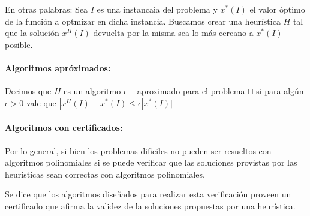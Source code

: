 En otras palabras: Sea \(I\) es una instancaia del problema y \(x^*(I)\) el valor óptimo de la función a optmizar en dicha instancia. Buscamos crear una heurística \(H\) tal que la solución \(x^H(I)\) devuelta por la misma sea lo más cercano a \(x^*(I)\) posible.

\paragraph{Algoritmos apróximados:} Decimos que \(H\) es un algoritmo \(\epsilon-\)aproximado para el problema \(\sqcap\) si para algún \(\epsilon > 0\) vale que \(|x^H(I) - x^*(I)\leq\epsilon|x^*(I)|\)

\paragraph{Algoritmos con certificados:} Por lo general, si bien los problemas dificiles no pueden ser resueltos con algoritmos polinomiales si se puede verificar que las soluciones provistas por las heurísticas sean correctas con algoritmos polinomiales. 

Se dice que los algoritmos diseñados para realizar esta verificación proveen un certificado que afirma la validez de la soluciones propuestas por una heurística.

\printbibliography[keyword=intro,title={Bibliografía}]
